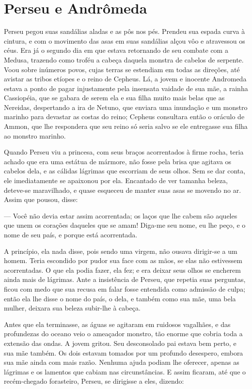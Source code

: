 \chapter{Perseu e Andrômeda}

Perseu pegou suas sandálias aladas e as pôs nos pés. Prendeu sua
espada curva à cintura, e com o movimento das asas em suas sandálias
alçou vôo e atravessou os céus. Era já o segundo dia em que estava
retornando de seu combate com a Medusa, trazendo como troféu a cabeça
daquela monstra de cabelos de serpente. Voou sobre inúmeros povos,
cujas terras se estendiam em todas as direções, até avistar as tribos
etíopes e o reino de Cepheus. Lá, a jovem e inocente Andromeda estava
a ponto de pagar injustamente pela insensata vaidade de sua mãe, a
rainha Cassiopéia, que se gabara de serem ela e sua filha muito mais
belas que as Nereidas, despertando a ira de Netuno, que enviara uma
inundação e um monstro marinho para devastar as costas do reino;
Cepheus consultara então o oráculo de Ammon, que lhe respondera que
seu reino só seria salvo se ele entregasse sua filha ao monstro
marinho.

Quando Perseu viu a princesa, com seus braços acorrentados à firme
rocha, teria achado que era uma estátua de mármore, não fosse pela
brisa que agitava os cabelos dela, e as cálidas lágrimas que
escorriam de seus olhos. Sem se dar conta, ele imediatamente se
apaixonou por ela. Encantado de ver tamanha beleza, deteve-se
maravilhado, e quase esqueceu de manter suas asas se movendo no ar.
Assim que pousou, disse:

— Você não devia estar assim acorrentada; os laços que lhe cabem são
aqueles que unem os corações daqueles que se amam! Diga-me seu nome,
eu lhe peço, e o nome de seu país, e porque está acorrentada.

A princípio, ela nada disse, pois sendo uma virgem, não ousava
dirigir-se a um homem. Teria escondido por pudor sua face com as
mãos, se elas não estivessem acorrentadas. O que ela podia fazer, ela
fez; e era deixar seus olhos se encherem ainda mais de lágrimas. Ante
a insistência de Perseu, que repetia suas perguntas, ficou com medo
que sua recusa em falar fosse entendida como admissão de culpa; então
ela lhe disse o nome do país, o dela, e também como sua mãe, uma bela
mulher, deixara sua beleza subir-lhe à cabeça.

Antes que ela terminasse, as águas se agitaram em ruidosos vagalhães,
e das profundezas do oceano veio o ameaçador monstro, tão enorme que
cobria toda a extensão das ondas. A jovem gritou. Seu desconsolado
pai estava bem perto, e sua mãe também. Os dois estavam tomados por
um profundo desespero, embora sua mãe ainda com mais razão. Nenhuma
ajuda podiam lhe oferecer, apenas as lágrimas e os lamentos que
cabiam nas circunstâncias. E assim ficaram, até que o recém-chegado
forasteiro, Perseu, se dirigisse a eles, dizendo:

